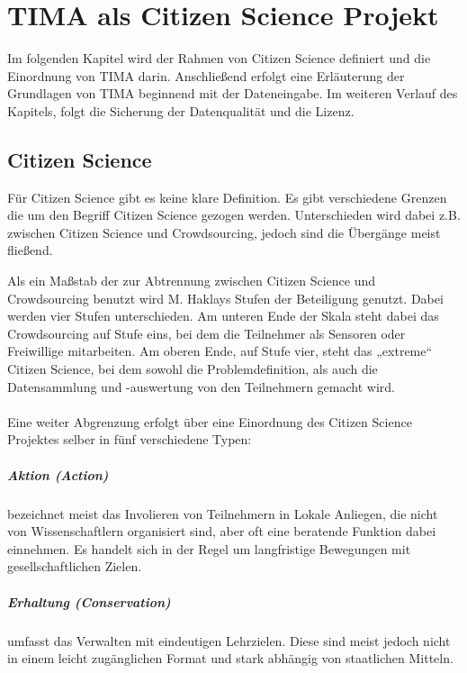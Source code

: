 \chapter{TIMA als Citizen Science Projekt}
Im folgenden Kapitel wird der Rahmen von Citizen Science definiert und die Einordnung von TIMA darin. Anschließend erfolgt eine Erläuterung der Grundlagen von TIMA beginnend mit der Dateneingabe. Im weiteren Verlauf des Kapitels, folgt die Sicherung der Datenqualität und die Lizenz.

\section{Citizen Science}
Für Citizen Science gibt es keine klare Definition. Es gibt verschiedene Grenzen die um den Begriff Citizen Science gezogen werden. Unterschieden wird dabei z.B. zwischen Citizen Science und Crowdsourcing, jedoch sind die Übergänge meist fließend.

Als ein Maßstab der zur Abtrennung zwischen Citizen Science und Crowdsourcing benutzt wird M. Haklays Stufen der Beteiligung genutzt. Dabei werden vier Stufen unterschieden. Am unteren Ende der Skala steht dabei das Crowdsourcing auf Stufe eins, bei dem die Teilnehmer als Sensoren oder Freiwillige mitarbeiten. Am oberen Ende, auf Stufe vier, steht das „extreme“ Citizen Science, bei dem sowohl die Problemdefinition, als auch die Datensammlung und -auswertung von den Teilnehmern gemacht wird.
\\~\\
Eine weiter Abgrenzung erfolgt über eine Einordnung des Citizen Science Projektes selber in fünf verschiedene Typen:

\paragraph{Aktion (Action)} bezeichnet meist das Involieren von Teilnehmern in Lokale Anliegen, die nicht von Wissenschaftlern organisiert sind, aber oft eine beratende Funktion dabei einnehmen. Es handelt sich in der Regel um langfristige Bewegungen mit gesellschaftlichen Zielen.

\paragraph{Erhaltung (Conservation)} umfasst das Verwalten mit eindeutigen Lehrzielen. Diese sind meist jedoch nicht in einem leicht zugänglichen Format und stark abhängig von staatlichen Mitteln.

